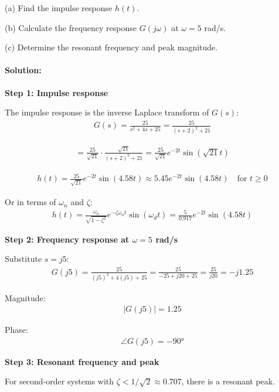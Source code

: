 \documentclass[11pt,a4paper]{article}
\begin{document}
(a) Find the impulse response $h(t)$.

(b) Calculate the frequency response $G(j\omega)$ at $\omega = 5$ rad/s.

(c) Determine the resonant frequency and peak magnitude.

\paragraph{Solution:}

\textbf{Step 1: Impulse response}

The impulse response is the inverse Laplace transform of $G(s)$:
\begin{align}
  G(s) = \frac{25}{s^2 + 4s + 25} = \frac{25}{(s+2)^2 + 21}
\end{align}

\begin{align}
  = \frac{25}{\sqrt{21}} \cdot \frac{\sqrt{21}}{(s+2)^2 + 21} = \frac{25}{\sqrt{21}}e^{-2t}\sin(\sqrt{21}t)
\end{align}

\begin{align}
  h(t) = \frac{25}{\sqrt{21}}e^{-2t}\sin(4.58t) \approx 5.45e^{-2t}\sin(4.58t) \quad \text{for } t \geq 0
\end{align}

Or in terms of $\omega_n$ and $\zeta$:
\begin{align}
  h(t) = \frac{\omega_n}{\sqrt{1-\zeta^2}}e^{-\zeta\omega_n t}\sin(\omega_d t) = \frac{5}{0.917}e^{-2t}\sin(4.58t)
\end{align}

\textbf{Step 2: Frequency response at $\omega = 5$ rad/s}

Substitute $s = j5$:
\begin{align}
  G(j5) = \frac{25}{(j5)^2 + 4(j5) + 25} = \frac{25}{-25 + j20 + 25} = \frac{25}{j20} = -j1.25
\end{align}

Magnitude:
\begin{align}
  |G(j5)| = 1.25
\end{align}

Phase:
\begin{align}
  \angle G(j5) = -90°
\end{align}

\textbf{Step 3: Resonant frequency and peak}

For second-order systems with $\zeta < 1/\sqrt{2} \approx 0.707$, there is a resonant peak.
\end{document}

